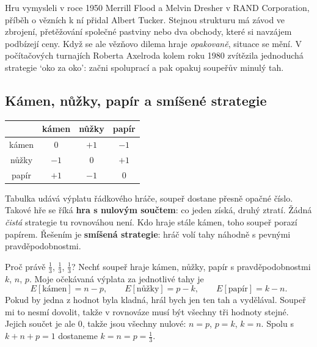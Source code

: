 Hru vymysleli v roce 1950 Merrill Flood a Melvin Dresher v RAND Corporation, příběh o vězních k ní přidal Albert Tucker. Stejnou strukturu má závod ve zbrojení, přetěžování společné pastviny nebo dva obchody, které si navzájem podbízejí ceny. Když se ale vězňovo dilema hraje \textit{opakovaně}, situace se mění. V počítačových turnajích Roberta Axelroda kolem roku 1980 zvítězila jednoduchá strategie `oko za oko': začni spoluprací a pak opakuj soupeřův minulý tah.

\subsection{Kámen, nůžky, papír a smíšené strategie}

\begin{center}
  \begin{tabular}{|c|c|c|c|}
    \hline
    & kámen & nůžky & papír\\
    \hline
    kámen & $0$ & $+1$ & $-1$\\
    \hline
    nůžky & $-1$ & $0$ & $+1$\\
    \hline
    papír & $+1$ & $-1$ & $0$\\
    \hline
  \end{tabular}
\end{center}

Tabulka udává výplatu řádkového hráče, soupeř dostane přesně opačné číslo. Takové hře se říká \textbf{hra s nulovým součtem}: co jeden získá, druhý ztratí. Žádná \textit{čistá} strategie tu rovnováhou není. Kdo hraje stále kámen, toho soupeř porazí papírem. Řešením je \textbf{smíšená strategie}: hráč volí tahy náhodně s pevnými pravděpodobnostmi.

\begin{example}
  Proč právě $\frac{1}{3}$, $\frac{1}{3}$, $\frac{1}{3}$? Nechť soupeř hraje kámen, nůžky, papír s pravděpodobnostmi $k$, $n$, $p$. Moje očekávaná výplata za jednotlivé tahy je
  \begin{equation*}
    E[\text{kámen}] = n - p,\qquad E[\text{nůžky}] = p - k,\qquad E[\text{papír}] = k - n.
  \end{equation*}
  Pokud by jedna z hodnot byla kladná, hrál bych jen ten tah a vydělával. Soupeř mi to nesmí dovolit, takže v rovnováze musí být všechny tři hodnoty stejné. Jejich součet je ale $0$, takže jsou všechny nulové: $n = p$, $p = k$, $k = n$. Spolu s $k + n + p = 1$ dostaneme $k = n = p = \frac{1}{3}$.
\end{example}

